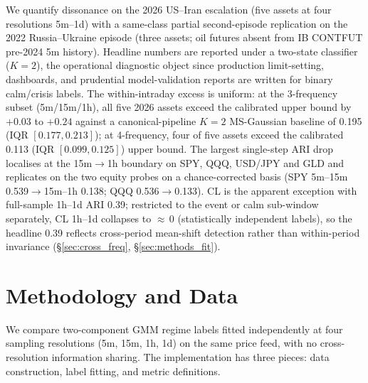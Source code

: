 \documentclass[preprint,12pt,authoryear]{elsarticle}
\begin{document}
We quantify dissonance on the 2026 US--Iran escalation \citep{ReutersIranMarkets2026Feb28,CaldaraIacoviello2022} (five assets at four resolutions 5m--1d) with a same-class partial second-episode replication on the 2022 Russia--Ukraine episode (three assets; oil futures absent from IB CONTFUT pre-2024 5m history). Headline numbers are reported under a two-state classifier ($K{=}2$), the operational diagnostic object since production limit-setting, dashboards, and prudential model-validation reports are written for binary calm/crisis labels. The within-intraday excess is uniform: at the 3-frequency subset (5m/15m/1h), all five 2026 assets exceed the calibrated upper bound by $+0.03$ to $+0.24$ against a canonical-pipeline $K{=}2$ MS-Gaussian baseline of 0.195 (IQR $[0.177, 0.213]$); at 4-frequency, four of five assets exceed the calibrated 0.113 (IQR $[0.099, 0.125]$) upper bound. The largest single-step ARI drop localises at the 15m$\to$1h boundary on SPY, QQQ, USD/JPY and GLD and replicates on the two equity probes on a chance-corrected basis (SPY 5m--15m 0.539$\to$15m--1h 0.138; QQQ 0.536$\to$0.133). CL is the apparent exception with full-sample 1h--1d ARI 0.39; restricted to the event or calm sub-window separately, CL 1h--1d collapses to ${\approx}\,0$ (statistically independent labels), so the headline 0.39 reflects cross-period mean-shift detection rather than within-period invariance (\S\ref{sec:cross_freq}, \S\ref{sec:methods_fit}).

\section{Methodology and Data}

We compare two-component GMM regime labels fitted independently at four sampling resolutions (5m, 15m, 1h, 1d) on the same price feed, with no cross-resolution information sharing. The implementation has three pieces: data construction, label fitting, and metric definitions.
\end{document}
